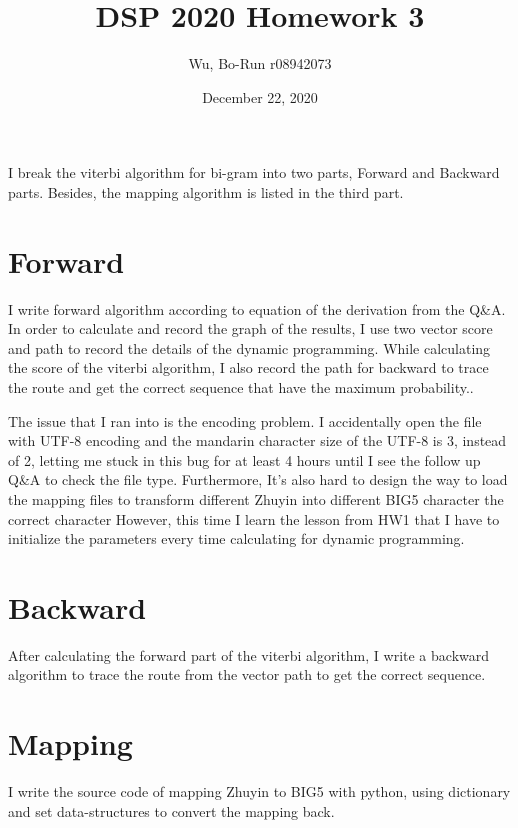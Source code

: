 \documentclass{article}
\title{DSP 2020 Homework 3}
\author{Wu, Bo-Run r08942073}
\date{December 22, 2020}
\begin{document}
\maketitle

\begin{center}
  I break the viterbi algorithm for bi-gram into two parts, Forward and Backward
  parts. Besides, the mapping algorithm is listed in the third part.
\end{center}

\section{Forward}
I write forward algorithm according to equation of the derivation from the Q\&A.
In order to calculate and record the graph of the results, I use two vector
score and path to record the details of the dynamic programming. While
calculating the score of the viterbi algorithm, I also record the path for
backward to trace the route and get the correct sequence that have the maximum
probability..

The issue that I ran into is the encoding problem. I accidentally open the file
with UTF-8 encoding and the mandarin character size of the UTF-8 is 3, instead
of 2, letting me stuck in this bug for at least 4 hours until I see the follow
up Q\&A to check the file type. Furthermore, It's also hard to design the way to
load the mapping files to transform different Zhuyin into different BIG5
character the correct character However, this time I learn the lesson from HW1
that I have to initialize the parameters every time calculating for dynamic
programming. 

\section{Backward}
After calculating the forward part of the viterbi algorithm, I write a backward
algorithm to trace the route from the vector path to get the correct sequence. 

\section{Mapping}
I write the source code of mapping Zhuyin to BIG5 with python, using dictionary
and set data-structures to convert the mapping back.
\end{document}
